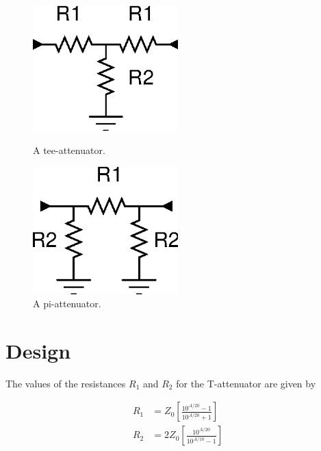 		\begin{figure}[ht]
			\begin{minipage}[b]{0.5\linewidth}
				\centering
				\includegraphics[width=0.5\textwidth]{fig/attenuators/tee-attenuator-symbolic}
				\caption{A tee-attenuator.}\label{fig:tee_att_simple}
			\end{minipage}
			\hspace{0.5cm}
			\begin{minipage}[b]{0.5\linewidth}
				\centering
				\includegraphics[width=0.5\textwidth]{fig/attenuators/pi-attenuator-symbolic}
			\caption{A pi-attenuator.}\label{fig:pi_att_simple}
			\end{minipage}
		\end{figure}

	\section{Design}

		The values of the resistances $R_1$ and $R_2$ for the T-attenuator are given by \autocite{matthaei80}
		
		\begin{align*}
			R_1 &= Z_0 \left[\frac{10^{A/20}-1}{10^{A/20}+1}\right] \\
			R_2 &= 2Z_0 \left[\frac{10^{A/20}}{10^{A/10}-1}\right]
		\end{align*}
		
